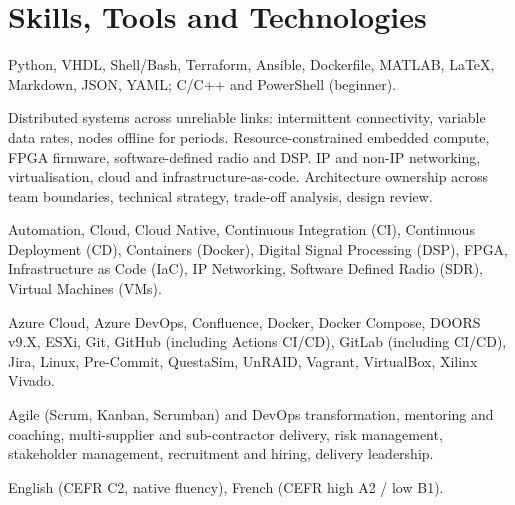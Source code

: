 %
%
%
\section{Skills, Tools and Technologies}
\location{}
Python, VHDL, Shell/Bash, Terraform, Ansible, Dockerfile, MATLAB, \LaTeX{}, Markdown, JSON, YAML; C/C++ and PowerShell (beginner).

\sectionsep{}
\location{}
Distributed systems across unreliable links: intermittent connectivity, variable data rates, nodes offline for periods. Resource-constrained embedded compute, FPGA firmware, software-defined radio and DSP. IP and non-IP networking, virtualisation, cloud and infrastructure-as-code. Architecture ownership across team boundaries, technical strategy, trade-off analysis, design review.

\sectionsep{}
\location{}
Automation, Cloud, Cloud Native, Continuous Integration (CI), Continuous Deployment (CD), Containers (Docker), Digital Signal Processing (DSP), FPGA, Infrastructure as Code (IaC), IP Networking, Software Defined Radio (SDR), Virtual Machines (VMs).

\sectionsep{}
\location{}
Azure Cloud, Azure DevOps, Confluence, Docker, Docker Compose, DOORS v9.X, ESXi, Git, GitHub (including Actions CI/CD), GitLab (including CI/CD), Jira, Linux, Pre-Commit, QuestaSim, UnRAID, Vagrant, VirtualBox, Xilinx Vivado.

\sectionsep{}
\location{}
Agile (Scrum, Kanban, Scrumban) and DevOps transformation, mentoring and coaching, multi-supplier and sub-contractor delivery, risk management, stakeholder management, recruitment and hiring, delivery leadership.

\sectionsep{}
\location{}
English (CEFR C2, native fluency), French (CEFR high A2 / low B1).

\sectionsep{}

